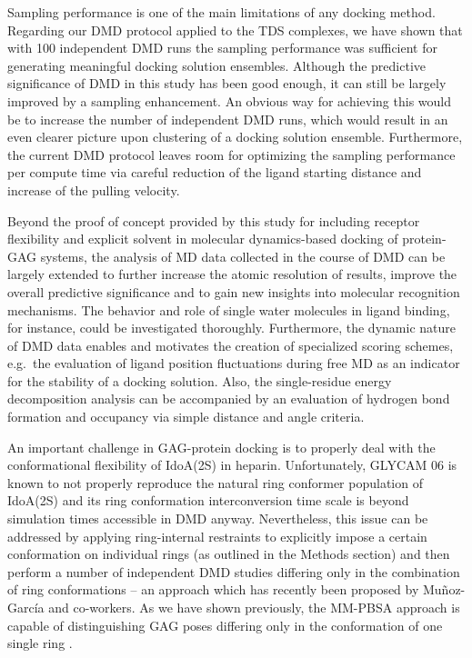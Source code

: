 Sampling performance is one of the main limitations of any docking method.
Regarding our DMD protocol applied to the TDS complexes, we have shown that with
100 independent DMD runs the sampling performance was sufficient for generating
meaningful docking solution ensembles. Although the predictive significance of
DMD in this study has been good enough, it can still be largely improved by a
sampling enhancement. An obvious way for achieving this would be to increase the
number of independent DMD runs, which would result in an even clearer picture
upon clustering of a docking solution ensemble. Furthermore, the current DMD
protocol leaves room for optimizing the sampling performance per compute time
via careful reduction of the ligand starting distance and increase of the
pulling velocity.

Beyond the proof of concept provided by this study for including receptor
flexibility and explicit solvent in molecular dynamics-based docking of protein-
GAG systems, the analysis of MD data collected in the course of DMD can be
largely extended to further increase the atomic resolution of results, improve
the overall predictive significance and to gain new insights into molecular
recognition mechanisms. The behavior and role of single water molecules in
ligand binding, for instance, could be investigated thoroughly. Furthermore, the
dynamic nature of DMD data enables and motivates the creation of specialized
scoring schemes, e.g.\ the evaluation of ligand position fluctuations during
free MD as an indicator for the stability of a docking solution. Also, the
single-residue energy decomposition analysis can be accompanied by an evaluation
of hydrogen bond formation and occupancy via simple distance and angle criteria.

An important challenge in GAG-protein docking is to properly deal with the
conformational flexibility of IdoA(2S) in
heparin\cite{Mulloy_dyn_conf_heparin_2000, barbero_jacs_2005}. Unfortunately,
GLYCAM 06 is known to not properly reproduce the natural ring conformer
population of IdoA(2S) \cite{gandhi_idoa2s_2010} and its ring conformation
interconversion time scale is beyond simulation times accessible in DMD
anyway{\cite{almond_jacs_2010}}. Nevertheless, this issue can be addressed by
applying ring-internal restraints to explicitly impose a certain conformation on
individual rings (as outlined in the Methods section) and then perform a number
of independent DMD studies differing only in the combination of ring
conformations -- an approach which has recently been proposed by Mu\~noz-
Garc\'ia and co-workers{\cite{conf_idoa_timeavg_restraints_2013}}. As we have
shown previously, the MM-PBSA approach is capable of distinguishing GAG poses
differing only in the conformation of one single
ring \cite{Samsonov_rings_cr_2013}.


